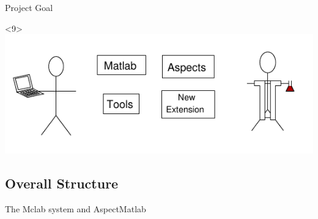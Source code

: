 \begin{frame}{Project Goal}
\begin{onlyenv}
    \end{onlyenv}
    \begin{onlyenv}<9>
      \includegraphics{images/perspectives_base.pdf}
    \end{onlyenv}
\end{frame}

\subsection{Overall Structure}
\begin{frame}{The Mclab system and AspectMatlab}
  \begin{center}
  \end{center}

\end{frame}
